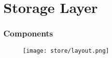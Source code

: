 \section{Storage Layer}


\begin{frame}
    \frametitle{ Components}
    \begin{figure}
        \centering
        \texttt{[image: store/layout.png]} %
       
    \end{figure}
\end{frame}

     

